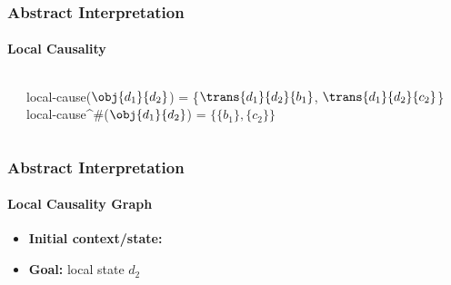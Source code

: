 \begin{frame}
\frametitle{Abstract Interpretation}
\framesubtitle{Local Causality}
\begin{columns}
\begin{column}{0.4\textwidth}
\begin{center}\scalebox{\scaleex}{
\begin{tikzpicture}
\exanaidef
\end{tikzpicture}
}\end{center}
\end{column}
\begin{column}[c]{0.6\textwidth}

local-cause($\obj{d_1}{d_2}$) = \{$\trans{d_1}{d_2}{b_1}$, $\trans{d_1}{d_2}{c_2}$\}
\medskip
local-cause^\#($\obj{d_1}{d_2}$) = $\{\{b_1\},\{c_2\}\}$ \\

\hspace*{5em}

\begin{center}\scalebox{\scaleex}{
\exlcgaidef
}\end{center}

\end{column}
\end{columns}
\end{frame}

\begin{frame}
\frametitle{Abstract Interpretation}
\framesubtitle{Local Causality Graph}
\begin{itemize}
 \item \textbf{Initial context/state:} 
 \item \textbf{Goal:} local state {\color{blue}$d_2$}
\end{itemize}
\begin{columns}
\begin{column}{0.5\textwidth}
\begin{center}\end{center}
\end{column}
\begin{column}{0.5\textwidth}
\begin{center}\scalebox{0.7}{
\exglcandef
}\end{center}
\end{column}
\end{columns}
\end{frame}

